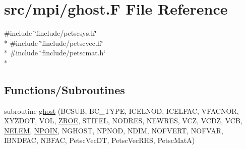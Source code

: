 \hypertarget{mpi_2ghost_8_f}{\section{src/mpi/ghost.F File Reference}
\label{mpi_2ghost_8_f}
}
{\ttfamily \#include \char`\"{}finclude/petscsys.\-h\char`\"{}}\\*
{\ttfamily \#include \char`\"{}finclude/petscvec.\-h\char`\"{}}\\*
{\ttfamily \#include \char`\"{}finclude/petscmat.\-h\char`\"{}}\\*
\subsection*{Functions/\-Subroutines}
\begin{DoxyCompactItemize}
\item 
subroutine \hyperlink{mpi_2ghost_8_f_afa697c6073bce293909a4e8a8cf5b1d8}{ghost} (B\-C\-S\-U\-B, B\-C\-\_\-\-T\-Y\-P\-E, I\-C\-E\-L\-N\-O\-D, I\-C\-E\-L\-F\-A\-C, V\-F\-A\-C\-N\-O\-R, X\-Y\-Z\-D\-O\-T, V\-O\-L, \hyperlink{myts_8com_a0c4fbcdb78e6b50c8919d714e4b5a694}{Z\-R\-O\-E}, S\-T\-I\-F\-E\-L, N\-O\-D\-R\-E\-S, N\-E\-W\-R\-E\-S, V\-C\-Z, V\-C\-D\-Z, V\-C\-B, \hyperlink{mesh_8com_aee5e75b79d0e815c0603cfbccc618957}{N\-E\-L\-E\-M}, \hyperlink{mesh_8com_ae28c1572321efcd8715b974d87d20c58}{N\-P\-O\-I\-N}, N\-G\-H\-O\-S\-T, N\-P\-N\-O\-D, N\-D\-I\-M, N\-O\-F\-V\-E\-R\-T, N\-O\-F\-V\-A\-R, I\-B\-N\-D\-F\-A\-C, N\-B\-F\-A\-C, Petsc\-Vec\-D\-T, Petsc\-Vec\-R\-H\-S, Petsc\-Mat\-A)
\end{DoxyCompactItemize}


